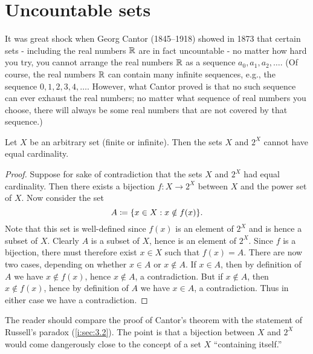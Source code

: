 \section{Uncountable sets}\label{i:sec:8.3}

\begin{note}
  It was great shock when Georg Cantor (1845--1918) showed in 1873 that certain sets
  - including the real numbers \(\mathbb{R}\) are in fact uncountable -
  no matter how hard you try, you cannot arrange the real numbers \(\mathbb{R}\) as a sequence \(a_0, a_1, a_2, \dots\).
  (Of course, the real numbers \(\mathbb{R}\) can contain many infinite sequences, e.g., the sequence \(0, 1, 2, 3, 4, \dots\).
  However, what Cantor proved is that no such sequence can ever exhaust the real numbers;
  no matter what sequence of real numbers you choose, there will always be some real numbers that are not covered by that sequence.)
\end{note}

\begin{thm}\label{i:8.3.1}
  Let \(X\) be an arbitrary set (finite or infinite).
  Then the sets \(X\) and \(2^X\) cannot have equal cardinality.
\end{thm}

\begin{proof}
  Suppose for sake of contradiction that the sets \(X\) and \(2^X\) had equal cardinality.
  Then there exists a bijection \(f : X \to 2^X\) between \(X\) and the power set of \(X\).
  Now consider the set
  \[
    A \coloneqq \set{x \in X : x \notin f(x)}.
  \]
  Note that this set is well-defined since \(f(x)\) is an element of \(2^X\) and is hence a subset of \(X\).
  Clearly \(A\) is a subset of \(X\), hence is an element of \(2^X\).
  Since \(f\) is a bijection, there must therefore exist \(x \in X\) such that \(f(x) = A\).
  There are now two cases, depending on whether \(x \in A\) or \(x \notin A\).
  If \(x \in A\), then by definition of \(A\) we have \(x \notin f(x)\), hence \(x \notin A\), a contradiction.
  But if \(x \notin A\), then \(x \notin f(x)\), hence by definition of \(A\) we have \(x \in A\), a contradiction.
  Thus in either case we have a contradiction.
\end{proof}

\begin{rmk}\label{i:8.3.2}
  The reader should compare the proof of Cantor's theorem with the statement of Russell's paradox (\cref{i:sec:3.2}).
  The point is that a bijection between \(X\) and \(2^X\) would come dangerously close to the concept of a set \(X\) ``containing itself.''
\end{rmk}

